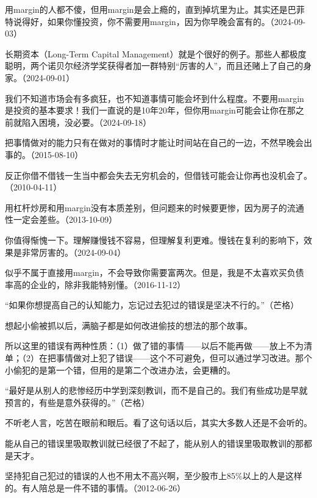 用margin的人都不傻，但用margin是会上瘾的，直到掉坑里为止。其实还是巴菲特说得好，如果你懂投资，你不需要用margin，因为你早晚会富有的。（2024-09-03）

长期资本（Long-Term Capital Management）就是个很好的例子。那些人都极度聪明，两个诺贝尔经济学奖获得者加一群特别“厉害的人”，而且还赌上了自己的身家。（2024-09-01）


我们不知道市场会有多疯狂，也不知道事情可能会坏到什么程度。不要用margin是投资的基本要求！我们一直说的是10年20年，但你用margin可能会让你在那之前就陷入困境，没必要。（2024-09-18）


把事情做对的能力只有在做对的事情时才能让时间站在自己的一边，不然早晚会出事的。（2015-08-10）

反正你借不借钱一生当中都会失去无穷机会的，但借钱可能会让你再也没机会了。（2010-04-11）

用杠杆炒房和用margin没有本质差别，但问题来的时候要更惨，因为房子的流通性一定会差些。（2013-10-09）


你值得惭愧一下。理解赚慢钱不容易，但理解复利更难。慢钱在复利的影响下，效果是非常厉害的。（2024-09-04）


似乎不属于直接用margin，不会导致你需要富两次。但是，我是不太喜欢买负债率高的企业的，除非我能特别懂。（2016-11-12）

“如果你想提高自己的认知能力，忘记过去犯过的错误是坚决不行的。”（芒格）

想起小偷被抓以后，满脑子都是如何改进偷技的想法的那个故事。

所以这里的错误有两种性质：（1）做了错的事情——以后不能再做——放上不为清单；（2）在把事情做对上犯了错误——这个不可避免，但可以通过学习改进。那个小偷犯的是第一个错，但用的是第二个改进办法，会更糟的。

“最好是从别人的悲惨经历中学到深刻教训，而不是自己的。我们有些成功是早就预言的，有些是意外获得的。”（芒格）

不听老人言，吃苦在眼前和眼后。看了这句话以后，其实大多数人还是不会听的。

能从自己的错误里吸取教训就已经很了不起了，能从别人的错误里吸取教训的那都是天才。

坚持犯自己犯过的错误的人也不用太不高兴啊，至少股市上85\%以上的人是这样的。有人陪总是一件不错的事情。（2012-06-26）
